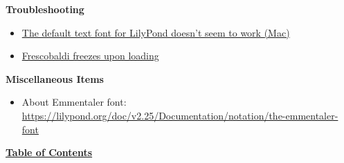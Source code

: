 \textbf{Troubleshooting}
\begin{itemize}
\item \href{https://github.com/Homebrew/homebrew-core/pull/118260#issuecomment-1368249969}{The default text font for LilyPond doesn’t seem to work (Mac)}
\item \href{https://github.com/frescobaldi/frescobaldi/issues/1793}{Frescobaldi freezes upon loading}
\end{itemize}

\textbf{Miscellaneous Items}
\begin{itemize}
\item About Emmentaler font: \url{https://lilypond.org/doc/v2.25/Documentation/notation/the-emmentaler-font}
\end{itemize}



\hyperref[sec:toc]{\textbf{Table of Contents}}